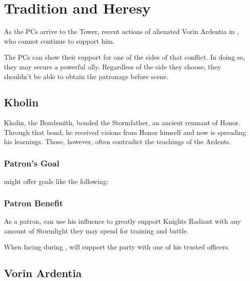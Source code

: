 \section{Tradition and Heresy}
\label{sec:dalinarVsArdents}

As the PCs arrive to the Tower, recent actions of \npcDalinar{} alienated Vorin Ardentia in \locationUrithiru{}, who cannot continue to support him.

The PCs can show their support for one of the sides of that conflict. In doing so, they may secure a powerful ally. Regardless of the side they choose, they shouldn't be able to obtain the patronage before  scene.



\subsection{\npcDalinarName{}{} Kholin}

\npcDalinar{} Kholin, the Bondsmith, bonded the Stormfather, an ancient remnant of Honor. Through that bond, he received visions from Honor himself and now is spreading his learnings. Those, however, often contradict the teachings of the Ardents.

\subsubsection{Patron's Goal}

\npcDalinar{} might offer goals like the following:


\subsubsection{Patron Benefit}

As a patron, \npcDalinar{} can use his influence to greatly support Knights Radiant with any amount of Stormlight they may spend for training and battle.

When facing \npcMidnightMother{} during , \npcDalinar{} will support the party with one of his trusted officers.




\subsection{Vorin Ardentia}

